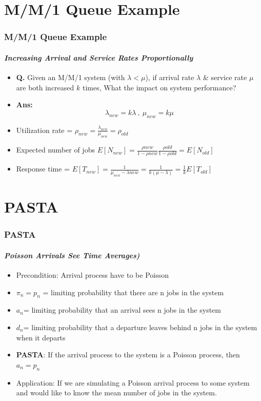 \documentclass{beamer}
\begin{document}
\section{M/M/1 Queue Example}
\begin{frame} 
\frametitle{M/M/1 Queue Example}
\framesubtitle{\textbf{\textit{ Increasing Arrival and Service Rates Proportionally}}}
\begin{itemize}
\item  \textbf{Q.} Given an M/M/1 system (with $\lambda < \mu$), if arrival rate $\lambda$ \& service rate $\mu$ are both increased $k$ times, What the impact on system performance?
\item \textbf{Ans:} $$ \lambda_{new} = k\lambda \:, \: \mu_{new} = k\mu $$
\item Utilization rate = $\rho_{new} = \frac{\lambda_{new}}{\mu_{new}}= \rho_{old}$
\item Expected number of jobs $E[N_{new}] = \frac{\rho{new}}{1-\rho{new}} \frac{\rho{old}}{1-\rho{old}} = E[N_{old}]$

\item Response time = $E[T_{new}] = \frac{1}{\mu_{new}-\lambda{new}} = \frac{1}{k(\mu-\lambda)}  = \frac{1}{k} E[T_{old}]$
\end{itemize}
\end{frame}

\section{PASTA }
\begin{frame} 
\frametitle{PASTA }
\framesubtitle{\textbf{\textit{ Poisson Arrivals See Time Averages)}}}
\begin{itemize}
\item Precondition: Arrival process have to be Poisson
\item  $\pi_n= p_n$ = limiting probability that there are n jobs in the system 
\item $a_n$= limiting probability that an arrival
sees n jobs in the system 
\item $d_n$= limiting probability that a departure leaves behind n jobs in the system when it departs 
\item \textbf{PASTA}:  If the arrival process to the system is a Poisson process, then $a_n = p_n$
\item Application:  If we are simulating a Poisson arrival process
to some system and would like to know the mean number of jobs in the system. 

\end{itemize}
\end{frame}
\end{document}
